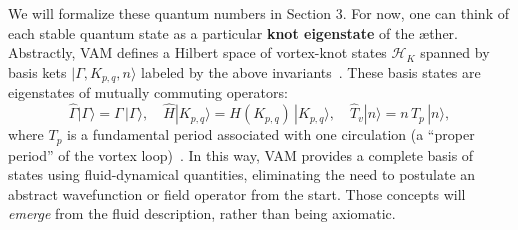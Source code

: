 \documentclass[preprint]{revtex4-2}
\begin{document}
    We will formalize these quantum numbers in Section 3. For now, one can think of each stable quantum state as a particular \textbf{knot eigenstate} of the æther. Abstractly, VAM defines a Hilbert space of vortex-knot states $\mathcal{H}_K$ spanned by basis kets $|\Gamma, K_{p,q}, n\rangle$ labeled by the above invariants~\cite{reference_40}. These basis states are eigenstates of mutually commuting operators:
    \[
        \hat{\Gamma}|\Gamma\rangle = \Gamma\,|\Gamma\rangle, \quad
        \hat{H} |K_{p,q}\rangle = H(K_{p,q})\,|K_{p,q}\rangle, \quad
        \hat{T}_v|n\rangle = n\,T_p\,|n\rangle,
    \]
    where $T_p$ is a fundamental period associated with one circulation (a “proper period” of the vortex loop)~\cite{reference_41}. In this way, VAM provides a complete basis of states using fluid-dynamical quantities, eliminating the need to postulate an abstract wavefunction or field operator from the start. Those concepts will \emph{emerge} from the fluid description, rather than being axiomatic.
\end{document}
